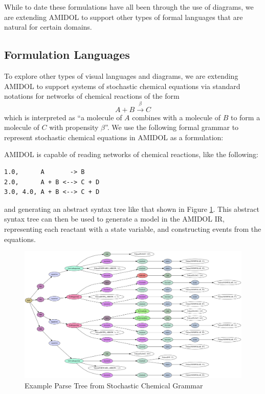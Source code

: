 \documentclass[11pt]{article}
\theoremstyle{definition}
\newcommand{\amidol}{\textsc{AMIDOL}}
\begin{document}
While to date these formulations have all been through the use of
diagrams, we are extending \amidol{} to support other types of formal
languages that are natural for certain domains.

\subsection{Formulation Languages}

To explore other types of visual languages and diagrams, we are
extending \amidol{} to support systems of stochastic chemical
equations via standard notations for networks of chemical reactions of
the form \[A +B \overset{\beta}{\rightarrow} C\] which is interpreted
as ``a molecule of $A$ combines with a molecule of $B$ to form a
molecule of $C$ with propensity $\beta$''.  We use the following
formal grammar to represent stochastic chemical equations in \amidol{}
as a formulation:



\amidol{} is capable of reading networks of chemical reactions, like
the following:

\begin{lstlisting}[caption=Example Stochastic Chemical Equation]
1.0,      A       -> B
2.0,      A + B <--> C + D
3.0, 4.0, A + B <--> C + D
\end{lstlisting}

and generating an abstract syntax tree like that shown in Figure
\ref{Fig:Reaction}.  This abstract syntax tree can then be used to
generate a model in the \amidol{} IR, representing each reactant with
a state variable, and constructing events from the equations.

\begin{figure}
  \includegraphics[width=\textwidth]{tree.png}
  \caption{Example Parse Tree from Stochastic Chemical Grammar}
  \label{Fig:Reaction}
\end{figure}
\end{document}
